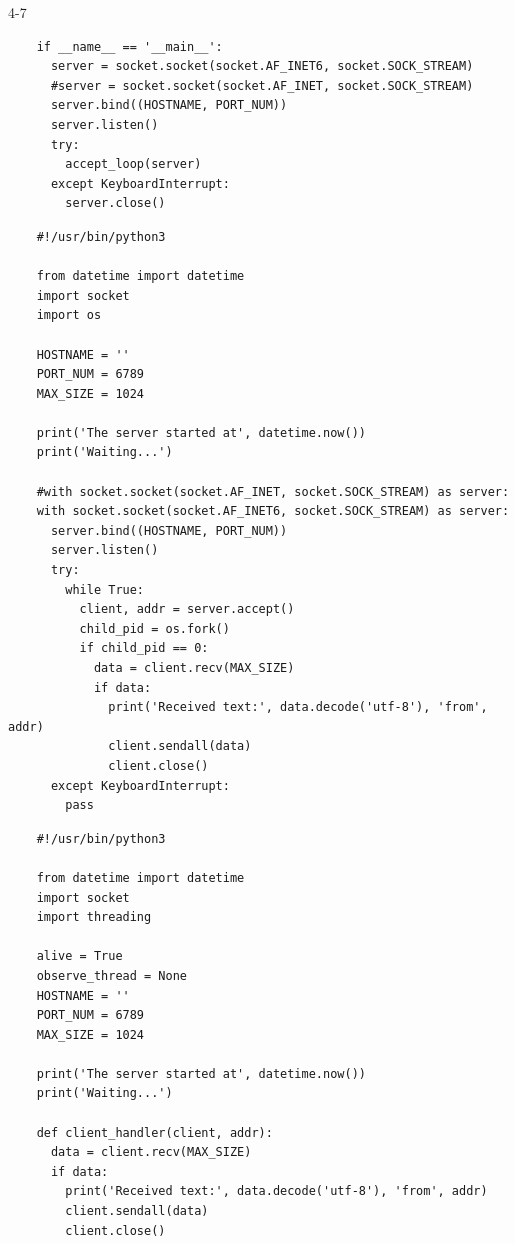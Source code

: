\begin{maintask}{4-7}
\begin{listing}[H]
\begin{verbatim}
    if __name__ == '__main__':
      server = socket.socket(socket.AF_INET6, socket.SOCK_STREAM)
      #server = socket.socket(socket.AF_INET, socket.SOCK_STREAM)
      server.bind((HOSTNAME, PORT_NUM))
      server.listen()
      try:
        accept_loop(server)
      except KeyboardInterrupt:
        server.close()
    \end{verbatim}
  \end{listing}
  \begin{listing}[H]
    \caption{IPv6対応tcp\_server\_fork.py}\label{lst:fork_server}
    \begin{verbatim}
    #!/usr/bin/python3

    from datetime import datetime
    import socket
    import os

    HOSTNAME = ''
    PORT_NUM = 6789
    MAX_SIZE = 1024

    print('The server started at', datetime.now())
    print('Waiting...')

    #with socket.socket(socket.AF_INET, socket.SOCK_STREAM) as server:
    with socket.socket(socket.AF_INET6, socket.SOCK_STREAM) as server:
      server.bind((HOSTNAME, PORT_NUM))
      server.listen()
      try:
        while True:
          client, addr = server.accept()
          child_pid = os.fork()
          if child_pid == 0:
            data = client.recv(MAX_SIZE)
            if data:
              print('Received text:', data.decode('utf-8'), 'from', addr)
              client.sendall(data)
              client.close()
      except KeyboardInterrupt:
        pass
    \end{verbatim}
  \end{listing}
  \begin{listing}[H]
    \caption{IPv6対応tcp\_server\_multithreading.py}\label{lst:thread_server}
    \begin{verbatim}
    #!/usr/bin/python3

    from datetime import datetime
    import socket
    import threading

    alive = True
    observe_thread = None
    HOSTNAME = ''
    PORT_NUM = 6789
    MAX_SIZE = 1024

    print('The server started at', datetime.now())
    print('Waiting...')

    def client_handler(client, addr):
      data = client.recv(MAX_SIZE)
      if data:
        print('Received text:', data.decode('utf-8'), 'from', addr)
        client.sendall(data)
        client.close()


\end{verbatim}
\end{listing}
\end{maintask}
